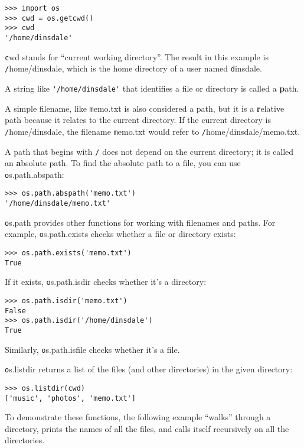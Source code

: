 \documentclass[
DIV=11,
fontsize=13,
twoside,
headinclude=false,
titlepage=firstiscover,
abstract=true,
headsepline=true,
footsepline=true,
chapterprefix=true, %
headings=big,
bibliography=totoc,%
captions=tableheading
]{scrbook}
\theoremstyle{definition}
\begin{document}
\begin{lstlisting}
>>> import os
>>> cwd = os.getcwd()
>>> cwd
'/home/dinsdale'
\end{lstlisting}
%
{\texttt cwd} stands for ``current working directory''.  The result in
this example is {\texttt /home/dinsdale}, which is the home directory of a
user named {\texttt dinsdale}.

A string like \verb"'/home/dinsdale'" that identifies a file or
directory is called a {\textbf path}.

A simple filename, like {\texttt memo.txt} is also considered a path,
but it is a {\textbf relative path} because it relates to the current
directory.  If the current directory is {\texttt /home/dinsdale}, the
filename {\texttt memo.txt} would refer to {\texttt /home/dinsdale/memo.txt}.
 
 

A path that begins with {\texttt /} does not depend on the current
directory; it is called an {\textbf absolute path}.  To find the absolute
path to a file, you can use {\texttt os.path.abspath}:

\begin{lstlisting}
>>> os.path.abspath('memo.txt')
'/home/dinsdale/memo.txt'
\end{lstlisting}
%
{\texttt os.path} provides other functions for working with filenames
and paths.  For example,
{\texttt os.path.exists} checks
whether a file or directory exists:

\begin{lstlisting}
>>> os.path.exists('memo.txt')
True
\end{lstlisting}
%
If it exists, {\texttt os.path.isdir} checks whether it's a directory:

\begin{lstlisting}
>>> os.path.isdir('memo.txt')
False
>>> os.path.isdir('/home/dinsdale')
True
\end{lstlisting}
%
Similarly, {\texttt os.path.isfile} checks whether it's a file.

{\texttt os.listdir} returns a list of the files (and other directories)
in the given directory:

\begin{lstlisting}
>>> os.listdir(cwd)
['music', 'photos', 'memo.txt']
\end{lstlisting}
%
To demonstrate these functions, the following example
``walks'' through a directory, prints
the names of all the files, and calls itself recursively on
all the directories.
\end{document}
